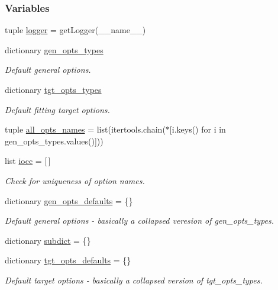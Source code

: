 \subsubsection*{\-Variables}
\begin{DoxyCompactItemize}
\item 
tuple \hyperlink{namespaceforcebalance_1_1parser_a0e0761161c5ff444c7afbcc9157cd710}{logger} = get\-Logger(\-\_\-\-\_\-name\-\_\-\-\_\-)
\item 
dictionary \hyperlink{namespaceforcebalance_1_1parser_a2ac3b892432d1c614c32eebeb8de41c5}{gen\-\_\-opts\-\_\-types}
\begin{DoxyCompactList}\small\item\em \-Default general options. \end{DoxyCompactList}\item 
dictionary \hyperlink{namespaceforcebalance_1_1parser_a1725a6ea3c588046339f9476f3e3f32e}{tgt\-\_\-opts\-\_\-types}
\begin{DoxyCompactList}\small\item\em \-Default fitting target options. \end{DoxyCompactList}\item 
tuple \hyperlink{namespaceforcebalance_1_1parser_ab0f8ac22b808f515531c830439d70bbb}{all\-\_\-opts\-\_\-names} = list(itertools.\-chain($\ast$\mbox{[}i.\-keys() for i in gen\-\_\-opts\-\_\-types.\-values()\mbox{]}))
\item 
list \hyperlink{namespaceforcebalance_1_1parser_af730ef69e27de8ffbf475f844c5c2d5f}{iocc} = \mbox{[}$\,$\mbox{]}
\begin{DoxyCompactList}\small\item\em \-Check for uniqueness of option names. \end{DoxyCompactList}\item 
dictionary \hyperlink{namespaceforcebalance_1_1parser_a807ea3a28fedbdfd494f5cc8da063202}{gen\-\_\-opts\-\_\-defaults} = \{\}
\begin{DoxyCompactList}\small\item\em \-Default general options -\/ basically a collapsed veresion of gen\-\_\-opts\-\_\-types. \end{DoxyCompactList}\item 
dictionary \hyperlink{namespaceforcebalance_1_1parser_abb7a7e9723de629aa97727a85bcdbad1}{subdict} = \{\}
\item 
dictionary \hyperlink{namespaceforcebalance_1_1parser_ad2c80e2b742fbd9594fd813dd51550e6}{tgt\-\_\-opts\-\_\-defaults} = \{\}
\begin{DoxyCompactList}\small\item\em \-Default target options -\/ basically a collapsed version of tgt\-\_\-opts\-\_\-types. \end{DoxyCompactList}\item 

\end{DoxyCompactItemize}

